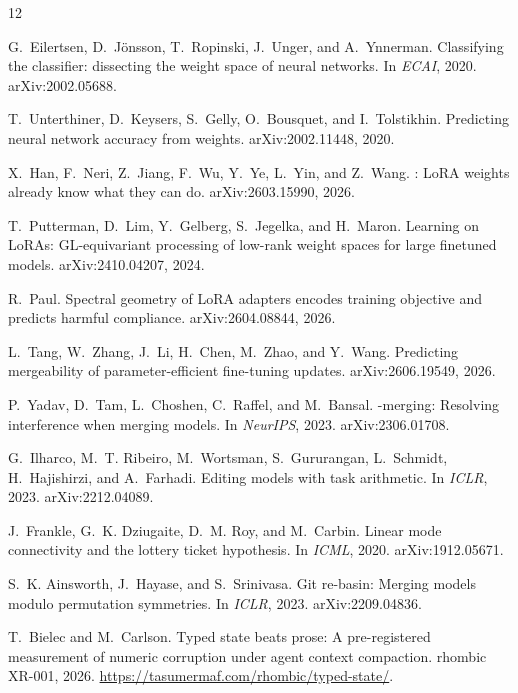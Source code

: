 \documentclass{article}
\begin{document}
\begin{thebibliography}{12}

G.~Eilertsen, D.~J{\"o}nsson, T.~Ropinski, J.~Unger, and A.~Ynnerman.
\newblock Classifying the classifier: dissecting the weight space of neural
  networks.
\newblock In \emph{ECAI}, 2020. arXiv:2002.05688.

T.~Unterthiner, D.~Keysers, S.~Gelly, O.~Bousquet, and I.~Tolstikhin.
\newblock Predicting neural network accuracy from weights.
\newblock arXiv:2002.11448, 2020.

X.~Han, F.~Neri, Z.~Jiang, F.~Wu, Y.~Ye, L.~Yin, and Z.~Wang.
: {LoRA} weights already know what they can do.
\newblock arXiv:2603.15990, 2026.

T.~Putterman, D.~Lim, Y.~Gelberg, S.~Jegelka, and H.~Maron.
\newblock Learning on {LoRAs}: {GL}-equivariant processing of low-rank
  weight spaces for large finetuned models.
\newblock arXiv:2410.04207, 2024.

R.~Paul.
\newblock Spectral geometry of {LoRA} adapters encodes training objective
  and predicts harmful compliance.
\newblock arXiv:2604.08844, 2026.

L.~Tang, W.~Zhang, J.~Li, H.~Chen, M.~Zhao, and Y.~Wang.
\newblock Predicting mergeability of parameter-efficient fine-tuning
  updates.
\newblock arXiv:2606.19549, 2026.

P.~Yadav, D.~Tam, L.~Choshen, C.~Raffel, and M.~Bansal.
-merging: Resolving interference when merging models.
\newblock In \emph{NeurIPS}, 2023. arXiv:2306.01708.

G.~Ilharco, M.~T. Ribeiro, M.~Wortsman, S.~Gururangan, L.~Schmidt,
  H.~Hajishirzi, and A.~Farhadi.
\newblock Editing models with task arithmetic.
\newblock In \emph{ICLR}, 2023. arXiv:2212.04089.

J.~Frankle, G.~K. Dziugaite, D.~M. Roy, and M.~Carbin.
\newblock Linear mode connectivity and the lottery ticket hypothesis.
\newblock In \emph{ICML}, 2020. arXiv:1912.05671.

S.~K. Ainsworth, J.~Hayase, and S.~Srinivasa.
\newblock Git re-basin: Merging models modulo permutation symmetries.
\newblock In \emph{ICLR}, 2023. arXiv:2209.04836.

T.~Bielec and M.~Carlson.
\newblock Typed state beats prose: A pre-registered measurement of numeric
  corruption under agent context compaction.
\newblock rhombic XR-001, 2026.
  \url{https://tasumermaf.com/rhombic/typed-state/}.

\end{thebibliography}
\end{document}
